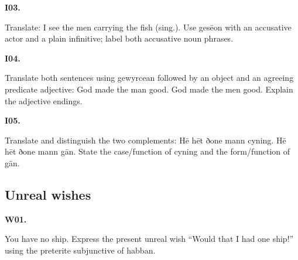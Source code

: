 \par\begin{minipage}{\linewidth}\raggedright
\textbf{I03.}

Translate: I see the men carrying the fish (sing.). Use gesēon with an accusative actor and a plain infinitive; label both accusative noun phrases.

\end{minipage}\par\addvspace{4pt}

\par\begin{minipage}{\linewidth}\raggedright
\textbf{I04.}

Translate both sentences using gewyrcean followed by an object and an agreeing predicate adjective: God made the man good. God made the men good. Explain the adjective endings.

\end{minipage}\par\addvspace{4pt}

\par\begin{minipage}{\linewidth}\raggedright
\textbf{I05.}

Translate and distinguish the two complements: Hē hēt ðone mann cyning. Hē hēt ðone mann gān. State the case/\allowbreak{}function of cyning and the form/\allowbreak{}function of gān.

\end{minipage}\par\addvspace{4pt}

\subsection*{Unreal wishes}

\par\begin{minipage}{\linewidth}\raggedright
\textbf{W01.}

You have no ship. Express the present unreal wish “Would that I had one ship!” using the preterite subjunctive of habban.

\end{minipage}\par\addvspace{4pt}

